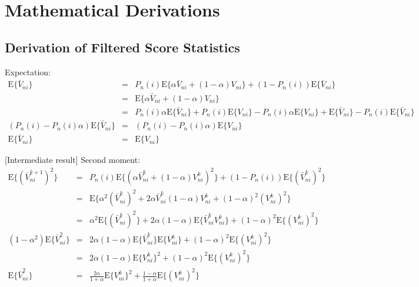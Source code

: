 \chapter{Mathematical Derivations}

\section{Derivation of Filtered Score Statistics}
\label{sec:derive-filtered-score}


Expectation:
\begin{eqnarray*}
\text{E}\{\bar{V}_{ni}\} & = & P_{n}(i)\text{E}\{\alpha\bar{V}_{ni}+(1-\alpha)V_{ni}\}+(1-P_{n}(i))\text{E}\{\bar{V}_{ni}\}\\
 & = & \text{E}\{\alpha\bar{V}_{ni}+(1-\alpha)V_{ni}\}\\
 & = & P_{n}(i)\alpha\text{E}\{\bar{V}_{ni}\}+P_{n}(i)\text{E}\{V_{ni}\}-P_{n}(i)\alpha\text{E}\{V_{ni}\}+\text{E}\{\bar{V}_{ni}\}-P_{n}(i)\text{E}\{\bar{V}_{ni}\}\\
(P_{n}(i)-P_{n}(i)\alpha)\text{E}\{\bar{V}_{ni}\} & = & (P_{n}(i)-P_{n}(i)\alpha)\text{E}\{V_{ni}\}\\
\text{E}\{\bar{V}_{ni}\} & = & \text{E}\{V_{ni}\}
\end{eqnarray*}


{[}Intermediate result{]} Second moment:
\begin{eqnarray*}
\text{E}\{(\bar{V}_{ni}^{k+1})^{2}\} & = & P_{n}(i)\text{E}\{(\alpha\bar{V}_{ni}^{k}+(1-\alpha)V_{ni}^{k})^{2}\}+(1-P_{n}(i))\text{E}\{(\bar{V}_{ni}^{k})^{2}\}\\
 & = & \text{E}\{\alpha^{2}(\bar{V}_{ni}^{k})^{2}+2\alpha\bar{V}_{ni}^{k}(1-\alpha)V_{ni}^{k}+(1-\alpha)^{2}(V_{ni}^{k})^{2}\}\\
 & = & \alpha^{2}\text{E}\{(\bar{V}_{ni}^{k})^{2}\}+2\alpha(1-\alpha)\text{E}\{\bar{V}_{ni}^{k}V_{ni}^{k}\}+(1-\alpha)^{2}\text{E}\{(V_{ni}^{k})^{2}\}\\
(1-\alpha^{2})\text{E}\{\bar{V}_{ni}^{2}\} & = & 2\alpha(1-\alpha)\text{E}\{\bar{V}_{ni}^{k}\}\text{E}\{V_{ni}^{k}\}+(1-\alpha)^{2}\text{E}\{(V_{ni}^{k})^{2}\}\\
 & = & 2\alpha(1-\alpha)\text{E}\{V_{ni}^{k}\}^{2}+(1-\alpha)^{2}\text{E}\{(V_{ni}^{k})^{2}\}\\
\text{E}\{\bar{V}_{ni}^{2}\} & = & \frac{2\alpha}{1+\alpha}\text{E}\{V_{ni}^{k}\}^{2}+\frac{1-\alpha}{1+\alpha}\text{E}\{(V_{ni}^{k})^{2}\}
\end{eqnarray*}


